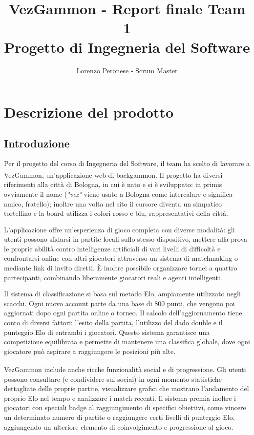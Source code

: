 \documentclass{article}
\title{VezGammon - Report finale Team 1 \\ \large Progetto di Ingegneria del Software}
\author{Lorenzo Peronese - Scrum Master}
\begin{document}
\maketitle

\tableofcontents

\newpage

\section{Descrizione del prodotto}
\subsection{Introduzione}
Per il progetto del corso di Ingegneria del Software, il team ha scelto di lavorare a VezGammon\textsuperscript{\texttrademark}, 
un'applicazione web di backgammon. Il progetto ha diversi riferimenti alla città di Bologna, in cui è nato e si è sviluppato: 
in primis ovviamente il nome (\textit{"vez"} viene usato a Bologna come intercalare e significa amico, fratello); inoltre una 
volta nel sito il cursore diventa un simpatico tortellino e la board utilizza i colori rosso e blu, rappresentativi della città.

L'applicazione offre un'esperienza di gioco completa con diverse modalità: gli utenti possono sfidarsi in partite locali sullo 
stesso dispositivo, mettere alla prova le proprie abilità contro intelligenze artificiali di vari livelli di difficoltà e confrontarsi 
online con altri giocatori attraverso un sistema di matchmaking o mediante link di invito diretti. È inoltre possibile organizzare 
tornei a quattro partecipanti, combinando liberamente giocatori reali e agenti intelligenti.

Il sistema di classificazione si basa sul metodo Elo, ampiamente utilizzato negli scacchi. Ogni nuovo account parte da una base 
di 800 punti, che vengono poi aggiornati dopo ogni partita online o torneo. Il calcolo dell'aggiornamento tiene conto di diversi 
fattori: l'esito della partita, l'utilizzo del dado double e il punteggio Elo di entrambi i giocatori. Questo sistema garantisce 
una competizione equilibrata e permette di mantenere una classifica globale, dove ogni giocatore può aspirare a raggiungere le 
posizioni più alte.

VezGammon\textsuperscript{\texttrademark} include anche ricche funzionalità social e di progressione. Gli utenti possono consultare 
(e condividere sui social) in ogni momento statistiche dettagliate delle proprie partite, visualizzare grafici che mostrano l'andamento 
del proprio Elo nel tempo e analizzare i match recenti. Il sistema premia inoltre i giocatori con speciali badge al raggiungimento 
di specifici obiettivi, come vincere un determinato numero di partite o raggiungere certi livelli di punteggio Elo, aggiungendo 
un ulteriore elemento di coinvolgimento e progressione al gioco.
\end{document}

